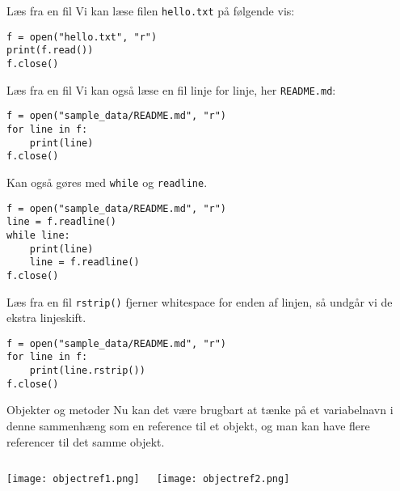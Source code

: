 \begin{frame}[fragile]{Læs fra en fil}
	Vi kan læse filen \texttt{hello.txt} på følgende vis:
	\begin{lstlisting}[style=python]
f = open("hello.txt", "r")
print(f.read())
f.close()
	\end{lstlisting}
	
\end{frame}

\begin{frame}[fragile]{Læs fra en fil}
	Vi kan også læse en fil linje for linje, her \texttt{README.md}:
	
	\begin{lstlisting}[style=python]
f = open("sample_data/README.md", "r")
for line in f:
	print(line)
f.close()
	\end{lstlisting}
	
	Kan også gøres med \texttt{while} og \texttt{readline}.
	\begin{lstlisting}[style=python]
f = open("sample_data/README.md", "r")
line = f.readline()
while line:
	print(line)
	line = f.readline()
f.close()
	\end{lstlisting}
\end{frame}


\begin{frame}[fragile]{Læs fra en fil}
	\texttt{rstrip()} fjerner whitespace for enden af linjen, så undgår vi de ekstra linjeskift.

\begin{lstlisting}[style=python]
f = open("sample_data/README.md", "r")
for line in f:
	print(line.rstrip())
f.close()
\end{lstlisting}

\end{frame}

\begin{frame}[fragile]{Objekter og metoder}
Nu kan det være brugbart at tænke på et variabelnavn i denne sammenhæng  som en reference til et objekt, og man kan have flere referencer til det samme objekt.

\begin{columns}
\texttt{[image: objectref1.png]}
	
	\pause
	
\texttt{[image: objectref2.png]}
\end{columns}

\end{frame}

